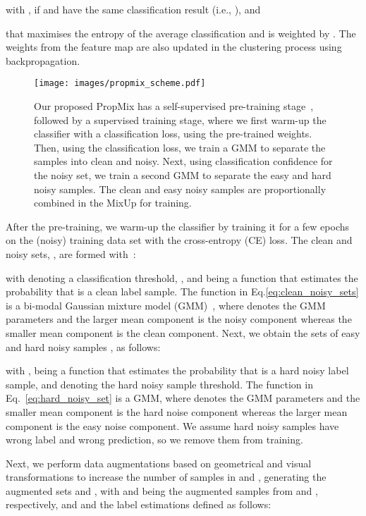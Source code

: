 \documentclass{bmvc2k}
\begin{document}
with 
,
 if  and  have the same classification result (i.e.,
),
and 

that maximises the entropy of the average classification and is weighted by . 
The weights from the feature map  are also updated in the clustering process using backpropagation.


\begin{figure}[!t]
\centering
\texttt{[image: images/propmix\_scheme.pdf]}
\caption{Our proposed PropMix has a self-supervised pre-training stage~\citep{SimCLR,MoCo,MoCoV2,SCAN}, followed by a supervised training stage, where we first warm-up the classifier with a classification loss, using the pre-trained weights. Then, using the classification loss, we train a GMM to separate the samples into clean and noisy. Next, using classification confidence for the noisy set, we train a second GMM to separate the easy and hard noisy samples. The clean and easy noisy samples are proportionally combined in the MixUp for training.  }
\label{fig:propmix}
\end{figure}
 

After the pre-training,  we warm-up the classifier by training it for a few epochs on the (noisy) training data set with the cross-entropy (CE) loss. The clean and noisy sets, , are formed with~\citep{arazo2019unsupervised, DivideMix,rog, jiang2020beyond}:

with  denoting a classification threshold,
, and  being a function that estimates the probability that  is a clean label sample.  The function  in Eq.\ref{eq:clean_noisy_sets} is a bi-modal Gaussian mixture model (GMM)~\citep{DivideMix}, where  denotes the GMM parameters and the larger mean component is the noisy component whereas the smaller mean component is the clean component. Next, we obtain the sets of easy and hard noisy samples , as follows: 

with ,  being a function that estimates the probability that  is a hard noisy label sample, and  denoting the hard noisy sample threshold.  The function  in Eq.~\ref{eq:hard_noisy_set} is a GMM, where  denotes the GMM parameters and the smaller mean component is the hard noise component whereas the larger mean component is the easy noise component. We assume hard noisy samples have wrong label and wrong prediction, so we remove them from training. 


Next, we perform  data augmentations based on geometrical and visual transformations to increase the number of samples in  and , generating the augmented sets  and , with  and  being the augmented samples from  and , respectively, and  and  the label estimations defined as follows:
\end{document}
